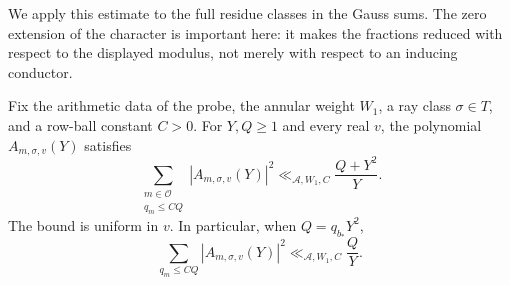 We apply this estimate to the full residue classes in the Gauss sums.
The zero extension of the character is important here: it makes the
fractions reduced with respect to the displayed modulus, not merely with
respect to an inducing conductor.

\begin{lemma}
\label{lem:balanced-additive-norm}
Fix the arithmetic data of the probe, the annular weight $W_1$, a ray class
$\sigma\in T$, and a row-ball constant $C>0$.  For $Y,Q\ge1$ and every
real $v$, the polynomial $A_{m,\sigma,v}(Y)$ satisfies
\[
 \sum_{\substack{m\in\mathcal O\\q_m\le CQ}}
       |A_{m,\sigma,v}(Y)|^2
 \ll_{\mathcal A,W_1,C}\frac{Q+Y^2}{Y}.
\]
The bound is uniform in $v$.  In particular, when $Q=q_{b_*}Y^2$,
\[
 \sum_{q_m\le CQ}|A_{m,\sigma,v}(Y)|^2
 \ll_{\mathcal A,W_1,C}\frac QY.
\]
\end{lemma}

